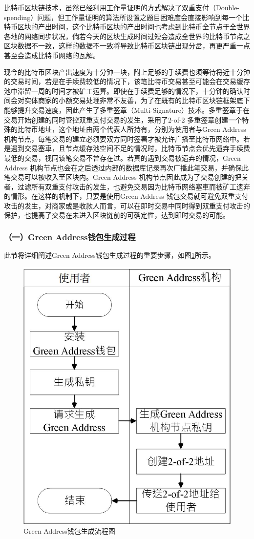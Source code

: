 			 	比特币区块链技术，虽然已经利用工作量证明的方式解决了双重支付（Double-spending）问题\supercite{Informationpropagationinthebitcoinnetwork}\supercite{Double-spendingfastpaymentsinbitcoin}，但工作量证明的算法所设置之题目困难度会直接影响到每一个比特币区块的产出时间，这个比特币区块的产出时间也考虑到比特币全节点于全世界各地的网络同步状况，倘若今天的区块生成时间过短会造成全世界的比特币节点之区块数据不一致，这样的数据不一致将导致比特币区块链出现分岔，再更严重一点甚至会造成比特币网络的瓦解。

			 	现今的⽐特币区块产出速度为⼗分钟⼀块，附上⾜够的⼿续费也须等待将近⼗分钟的交易时间，若是在⼿续费较低的情况下，该笔⽐特币交易甚⾄可能会在交易缓存池中滞留⼀周的时间才被矿工运算。即使在⼿续费⾜够的情况下，⼗分钟的确认时间会对实体商家的⼩额交易处理⾮常不友善，为了在既有的⽐特币区块链框架底下能够提升交易速度，因此产生了多重签章（Multi-Signature）技术。多重签章于在交易开始创建的同时管控双重⽀付交易的发⽣，采⽤了2-of-2 多重签章创建⼀个特殊的⽐特币地址，这个地址由两个代表⼈所持有，分别为使⽤者与Green Address\supercite{GreenAddress}机构节点，每笔交易的建⽴必须要双⽅同时签署才被允许广播⾄⽐特币网络中。若是遇到交易塞⾞，且节点缓存池空间不⾜的情况时，⽐特币节点会优先遗弃⼿续费最低的交易，视同该笔交易不曾存在过。若真的遇到交易被遗弃的情况，Green Address 机构节点也会在之后透过内部的数据库记录再次广播此笔交易，并确保此笔交易可以被收⼊⾄区块内。Green Address 机构节点因此成为了交易创建的把关者，过滤所有双重⽀付攻击的发⽣，也避免交易因为⽐特币网络塞⾞⽽被矿⼯遗弃的情形。在这样的机制下，只要是使⽤Green Address 钱包交易就可避免双重⽀付攻击的发⽣，对商家或是收款⼈⽽⾔，可以在即时交易中同时得到双重⽀付攻击的保护，也提高了交易在未进⼊区块链前的可确定性，达到即时交易的可能。

			 	\subsubsection{（一）Green Address钱包生成过程}
			 	此节将详细阐述Green Address钱包生成过程的重要步骤，如图\ref{gabuild}所示。
			 	\begin{figure}[!htbp]
					\centering
					\includegraphics[width = .4\textwidth]{gabuild.jpg}
					\caption{Green Address钱包生成流程图}\label{gabuild}
				\end{figure}

